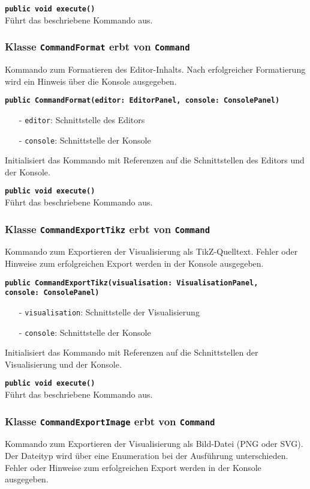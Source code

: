\documentclass[parskip=full,11pt,twoside]{scrartcl}
\begin{document}
\textbf{\texttt{public void execute()}}\\
Führt das beschriebene Kommando aus.

\subsubsection{Klasse \texttt{CommandFormat} erbt von \texttt{Command}}
Kommando zum Formatieren des Editor-Inhalts. Nach erfolgreicher Formatierung wird ein Hinweis über die Konsole ausgegeben.

\textbf{\texttt{public CommandFormat(editor: EditorPanel, console: ConsolePanel)}}\\
\begin{itemize}[noitemsep]
	\item[-] \texttt{editor}: Schnittstelle des Editors
	\item[-] \texttt{console}: Schnittstelle der Konsole
\end{itemize}
Initialisiert das Kommando mit Referenzen auf die Schnittstellen des Editors und der Konsole.

\textbf{\texttt{public void execute()}}\\
Führt das beschriebene Kommando aus.

\subsubsection{Klasse \texttt{CommandExportTikz} erbt von \texttt{Command}}
Kommando zum Exportieren der Visualisierung als TikZ-Quelltext. Fehler oder Hinweise zum erfolgreichen Export werden in der Konsole ausgegeben.

\textbf{\texttt{public CommandExportTikz(visualisation: VisualisationPanel,\\console: ConsolePanel)}}\\
\begin{itemize}[noitemsep]
	\item[-] \texttt{visualisation}: Schnittstelle der Visualisierung
	\item[-] \texttt{console}: Schnittstelle der Konsole
\end{itemize}
Initialisiert das Kommando mit Referenzen auf die Schnittstellen der Visualisierung und der Konsole.

\textbf{\texttt{public void execute()}}\\
Führt das beschriebene Kommando aus.

\subsubsection{Klasse \texttt{CommandExportImage} erbt von \texttt{Command}}
Kommando zum Exportieren der Visualisierung als Bild-Datei (PNG oder SVG). Der Dateityp wird über eine Enumeration bei der Ausführung unterschieden. Fehler oder Hinweise zum erfolgreichen Export werden in der Konsole ausgegeben.
\end{document}
